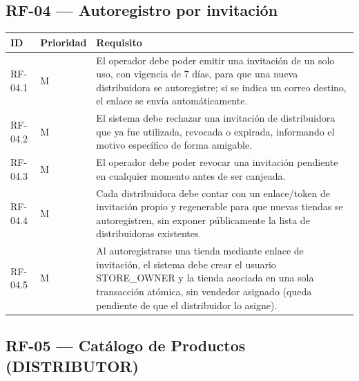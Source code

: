 \documentclass[12pt,a4paper]{report}
\begin{document}
\subsection{RF-04 --- Autoregistro por invitación}

\begin{longtable}{|p{2cm}|p{2cm}|p{10cm}|}
\hline
\textbf{ID} & \textbf{Prioridad} & \textbf{Requisito} \\ \hline
RF-04.1 & M & El operador debe poder emitir una invitación de un solo uso, con vigencia de 7 días, para que una nueva distribuidora se autoregistre; si se indica un correo destino, el enlace se envía automáticamente. \\ \hline
RF-04.2 & M & El sistema debe rechazar una invitación de distribuidora que ya fue utilizada, revocada o expirada, informando el motivo específico de forma amigable. \\ \hline
RF-04.3 & M & El operador debe poder revocar una invitación pendiente en cualquier momento antes de ser canjeada. \\ \hline
RF-04.4 & M & Cada distribuidora debe contar con un enlace/token de invitación propio y regenerable para que nuevas tiendas se autoregistren, sin exponer públicamente la lista de distribuidoras existentes. \\ \hline
RF-04.5 & M & Al autoregistrarse una tienda mediante enlace de invitación, el sistema debe crear el usuario STORE\_OWNER y la tienda asociada en una sola transacción atómica, sin vendedor asignado (queda pendiente de que el distribuidor lo asigne). \\ \hline
\end{longtable}

\subsection{RF-05 --- Catálogo de Productos (DISTRIBUTOR)}
\end{document}
